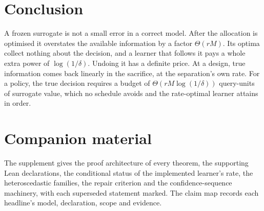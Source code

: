 \section{Conclusion}

A frozen surrogate is not a small error in a correct model. After the allocation is optimised
it overstates the available information by a factor $\Theta(rM)$. Its optima collect nothing
about the decision, and a learner that follows it pays a whole extra power of $\log(1/\delta)$.
Undoing it has a definite price. At a design, true information comes back linearly in the
sacrifice, at the separation's own rate. For a policy, the true decision requires a budget of
$\Theta(rM\log(1/\delta))$ query-units of surrogate value, which no schedule avoids and the
rate-optimal learner attains in order.

\section*{Companion material}
The supplement gives the proof architecture of every theorem, the supporting Lean declarations,
the conditional status of the implemented learner's rate, the heteroscedastic families, the
repair criterion and the confidence-sequence machinery, with each superseded statement marked.
The claim map records each headline's model, declaration, scope and evidence.

